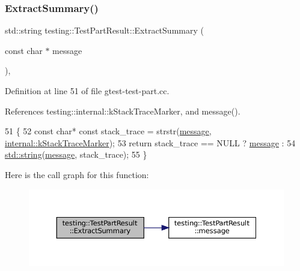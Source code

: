\subsubsection{\texorpdfstring{Extract\+Summary()}{ExtractSummary()}}
{\footnotesize\ttfamily std\+::string testing\+::\+Test\+Part\+Result\+::\+Extract\+Summary (\begin{DoxyParamCaption}\item[{const char $\ast$}]{message }\end{DoxyParamCaption})\hspace{0.3cm}{\ttfamily [static]}, {\ttfamily [private]}}



Definition at line 51 of file gtest-\/test-\/part.\+cc.



References testing\+::internal\+::k\+Stack\+Trace\+Marker, and message().


\begin{DoxyCode}
51                                                             \{
52   \textcolor{keyword}{const} \textcolor{keywordtype}{char}* \textcolor{keyword}{const} stack\_trace = strstr(\hyperlink{classtesting_1_1TestPartResult_a5019dc9d753aba5949777270de255d49}{message}, 
      \hyperlink{namespacetesting_1_1internal_abb38528ca6a45df265b19f5ccb3d16d9}{internal::kStackTraceMarker});
53   \textcolor{keywordflow}{return} stack\_trace == NULL ? \hyperlink{classtesting_1_1TestPartResult_a5019dc9d753aba5949777270de255d49}{message} :
54       \hyperlink{namespacetesting_1_1internal_a8e8ff5b11e64078831112677156cb111}{std::string}(\hyperlink{classtesting_1_1TestPartResult_a5019dc9d753aba5949777270de255d49}{message}, stack\_trace);
55 \}
\end{DoxyCode}
Here is the call graph for this function\+:
\nopagebreak
\begin{figure}[H]
\begin{center}
\leavevmode
\includegraphics[width=350pt]{classtesting_1_1TestPartResult_ac4f4c5383ff6178f441f8bf4ce5ebbff_cgraph}
\end{center}
\end{figure}
\mbox{\label{classtesting_1_1TestPartResult_aa04b377c3e7ed57d39e882df5561ac90}} 
